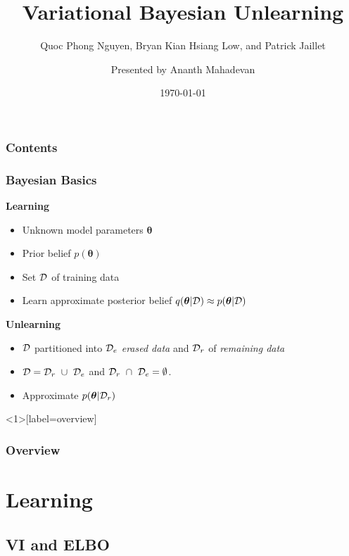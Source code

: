 \documentclass[pdf]{beamer}
\title{Variational Bayesian Unlearning}
\subtitle[]{Quoc Phong Nguyen, Bryan Kian Hsiang Low, and Patrick Jaillet}
\author[Nguyen et al]{Presented by Ananth Mahadevan}
\date{\today}
\begin{document}
\begin{frame}
    \titlepage
\end{frame}

\begin{frame}
    \frametitle{Contents}
    \tableofcontents
\end{frame}

\begin{frame}
  \frametitle{Bayesian Basics}
  \textbf{Learning}
  \begin{itemize}
    \item Unknown model parameters $\bm{\theta}$ 
    \item Prior belief $p(\bm{\theta})$ 
    \item Set $\mathcal{D}$ of training data
    \item Learn approximate posterior belief $q(\bm{\theta}|\mathcal{D}) \approx p(\bm{\theta}|\mathcal{D})$ 
  \end{itemize}
  \textbf{Unlearning}
  \begin{itemize}
    \item $\mathcal{D}$ partitioned into $\mathcal{D}_e$ \emph{erased data} and $\mathcal{D}_r$ of \emph{remaining data} 
    \item $\mathcal{D} = \mathcal{D}_r\ \cup\ \mathcal{D}_e$ and $\mathcal{D}_r\ \cap\ \mathcal{D}_e = \emptyset$. 
    \item Approximate $p(\bm{\theta}|\mathcal{D}_r)$ 
  \end{itemize}
\end{frame}

\begin{frame}<1>[label=overview]
  \frametitle{Overview}
  
\end{frame}

\section{Learning}

\subsection{VI and ELBO}
\end{document}
